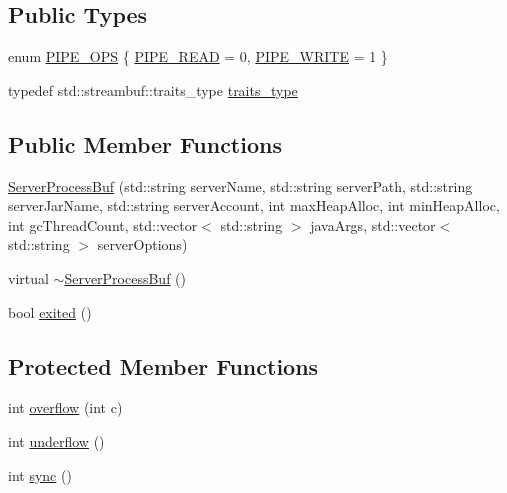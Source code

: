 \subsection*{Public Types}
\begin{DoxyCompactItemize}
\item 
enum \hyperlink{class_minecraft_server_service_1_1_server_process_buf_a0eed8de4b7fde1d89e832c958570ee5a}{P\+I\+P\+E\+\_\+\+O\+PS} \{ \hyperlink{class_minecraft_server_service_1_1_server_process_buf_a0eed8de4b7fde1d89e832c958570ee5aa92978ad715088b2f9b66604eb9d020e6}{P\+I\+P\+E\+\_\+\+R\+E\+AD} = 0, 
\hyperlink{class_minecraft_server_service_1_1_server_process_buf_a0eed8de4b7fde1d89e832c958570ee5aa167b881efc832298de7aa37a1d77c001}{P\+I\+P\+E\+\_\+\+W\+R\+I\+TE} = 1
 \}
\item 
typedef std\+::streambuf\+::traits\+\_\+type \hyperlink{class_minecraft_server_service_1_1_server_process_buf_a9c3a4b61a15b7051a7d8c84aae90ae6f}{traits\+\_\+type}
\end{DoxyCompactItemize}
\subsection*{Public Member Functions}
\begin{DoxyCompactItemize}
\item 
\hyperlink{class_minecraft_server_service_1_1_server_process_buf_a85dc6fa4e2d6a14cfed883b1fc7fec00}{Server\+Process\+Buf} (std\+::string server\+Name, std\+::string server\+Path, std\+::string server\+Jar\+Name, std\+::string server\+Account, int max\+Heap\+Alloc, int min\+Heap\+Alloc, int gc\+Thread\+Count, std\+::vector$<$ std\+::string $>$ java\+Args, std\+::vector$<$ std\+::string $>$ server\+Options)
\item 
virtual \hyperlink{class_minecraft_server_service_1_1_server_process_buf_a468e3dbe9766a721b9fa88fed5b5a05c}{$\sim$\+Server\+Process\+Buf} ()
\item 
bool \hyperlink{class_minecraft_server_service_1_1_server_process_buf_aea2e874a9ba6aa6558201008d9b909f0}{exited} ()
\end{DoxyCompactItemize}
\subsection*{Protected Member Functions}
\begin{DoxyCompactItemize}
\item 
int \hyperlink{class_minecraft_server_service_1_1_server_process_buf_ae448f15f461884715dbbbd70ce917b5e}{overflow} (int c)
\item 
int \hyperlink{class_minecraft_server_service_1_1_server_process_buf_a25f72094cc3cbe3f70a639bce627988a}{underflow} ()
\item 
int \hyperlink{class_minecraft_server_service_1_1_server_process_buf_a9b9ade40c919e07111d3ca76579bbaed}{sync} ()
\end{DoxyCompactItemize}
